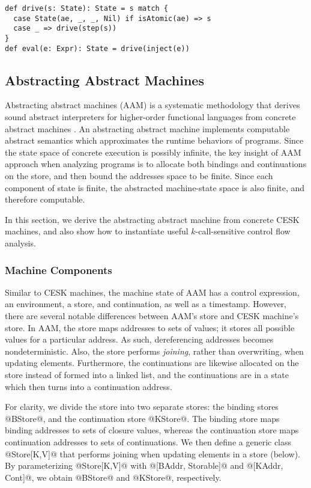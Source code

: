 \documentclass[acmsmall]{acmart}\settopmatter{}
\begin{document}
\begin{lstlisting}
def drive(s: State): State = s match {
  case State(ae, _, _, Nil) if isAtomic(ae) => s
  case _ => drive(step(s))
}
def eval(e: Expr): State = drive(inject(e))
\end{lstlisting}

\subsection{Abstracting Abstract Machines} \label{aam}
Abstracting abstract machines (AAM) is a systematic methodology that derives sound
abstract interpreters for higher-order functional languages from concrete
abstract machines \cite{van2012systematic, van2010abstracting}.
An abstracting abstract machine implements computable abstract semantics which
approximates the runtime behaviors of programs.
Since the state space of concrete execution is possibly infinite,
the key insight of AAM approach when analyzing programs is to allocate both bindings
and continuations on the store, and then bound the addresses space to be finite.
Since each component of state is finite,
the abstracted machine-state space is also finite, and therefore computable.

In this section, we derive the abstracting abstract machine from concrete
CESK machines, and also show how to instantiate
useful $k$-call-sensitive control flow analysis.

\subsubsection{Machine Components}

Similar to CESK machines, the machine state of AAM has a control expression,
an environment, a store, and continuation, as well as a timestamp.
However, there are several notable differences between AAM's store and CESK machine's store.
In AAM, the store maps addresses to sets of values; it stores all possible values
for a particular address. As such, dereferencing addresses becomes nondeterministic.
Also, the store performs \emph{joining}, rather than overwriting, when updating elements.
Furthermore, the continuations are likewise allocated on the store instead of formed into a
linked list, and the continuations are in a state which then turns into a continuation
address.

For clarity, we divide the store into two separate stores: the binding stores @BStore@, and
the continuation store @KStore@.
The binding store maps binding addresses to sets of closure values, whereas the continuation
store maps continuation addresses to sets of continuations.
We then define a generic class @Store[K,V]@ that performs joining when updating elements
in a store (below). By parameterizing @Store[K,V]@ with @[BAddr, Storable]@ and
@[KAddr, Cont]@, we obtain @BStore@ and @KStore@, respectively.
\end{document}
